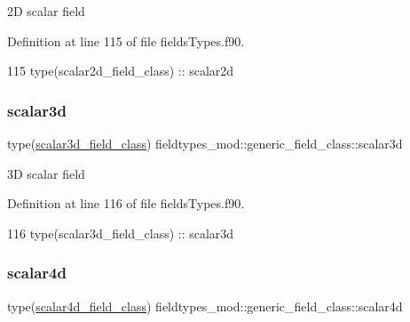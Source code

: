 2D scalar field 



Definition at line 115 of file fields\+Types.\+f90.


\begin{DoxyCode}
115         \textcolor{keywordtype}{type}(scalar2d\_field\_class) :: scalar2d
\end{DoxyCode}
\mbox{\label{structfieldtypes__mod_1_1generic__field__class_a8ffce3cc5f44742a29d0d9815301f218}} 
\subsubsection{\texorpdfstring{scalar3d}{scalar3d}}
{\footnotesize\ttfamily type(\mbox{\hyperlink{structfieldtypes__mod_1_1scalar3d__field__class}{scalar3d\+\_\+field\+\_\+class}}) fieldtypes\+\_\+mod\+::generic\+\_\+field\+\_\+class\+::scalar3d\hspace{0.3cm}{\ttfamily [private]}}



3D scalar field 



Definition at line 116 of file fields\+Types.\+f90.


\begin{DoxyCode}
116         \textcolor{keywordtype}{type}(scalar3d\_field\_class) :: scalar3d
\end{DoxyCode}
\mbox{\label{structfieldtypes__mod_1_1generic__field__class_a9e48e8cd99ca98d4d8dd1f40f9002899}} 
\subsubsection{\texorpdfstring{scalar4d}{scalar4d}}
{\footnotesize\ttfamily type(\mbox{\hyperlink{structfieldtypes__mod_1_1scalar4d__field__class}{scalar4d\+\_\+field\+\_\+class}}) fieldtypes\+\_\+mod\+::generic\+\_\+field\+\_\+class\+::scalar4d\hspace{0.3cm}{\ttfamily [private]}}



